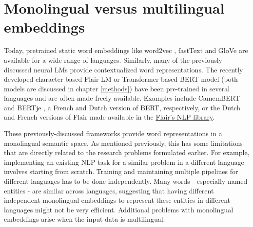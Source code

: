 \documentclass[12pt,a4paper,]{book}
\begin{document}
\hypertarget{monolingual-versus-multilingual-embeddings}{%
\section{Monolingual versus multilingual embeddings}\label{monolingual-versus-multilingual-embeddings}}

Today, pretrained static word embeddings like word2vec \citep{mikolov2013}, fastText \citep{bojanowski2017} and GloVe \citep{pennington2014} are available for a wide range of languages. Similarly, many of the previously discussed neural LMs provide contextualized word representations. The recently developed character-based Flair LM \citep{akbik2018} or Transformer-based BERT model \citep{devlin2019} (both models are discussed in chapter \ref{methods}) have been pre-trained in several languages and are often made freely available. Examples include CamemBERT \citep{martin2019} and BERTje \citep{devries2019}, a French and Dutch version of BERT, respectively, or the Dutch and French versions of Flair made available in the \href{https://github.com/flairNLP/flair/blob/master/resources/docs/embeddings/FLAIR_EMBEDDINGS.md}{Flair's NLP library}.

These previously-discussed frameworks provide word representations in a monolingual semantic space. As mentioned previously, this has some limitations that are directly related to the research problems formulated earlier. For example, implementing an existing NLP task for a similar problem in a different language involves starting from scratch. Training and maintaining multiple pipelines for different languages has to be done independently. Many words - especially named entities - are similar across languages, suggesting that having different independent monolingual embeddings to represent these entities in different languages might not be very efficient. Additional problems with monolingual embeddings arise when the input data is multilingual.
\end{document}
